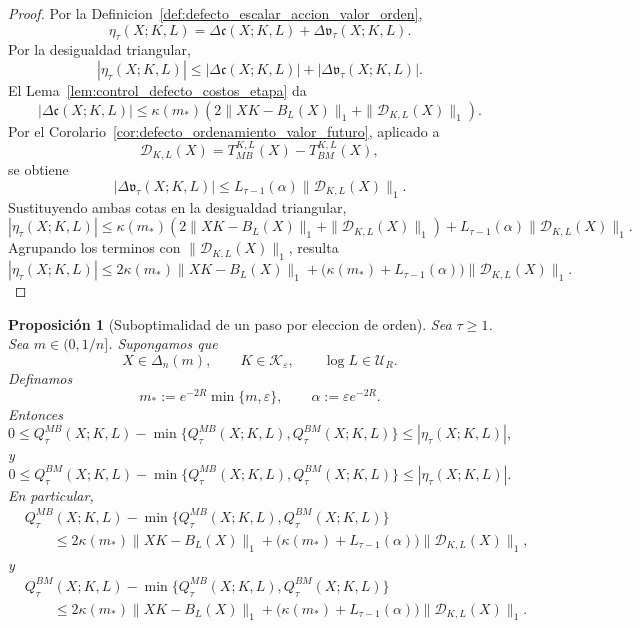 ﻿\documentclass[12pt]{article}
\newtheorem{proposicion}{Proposición}[section]
\begin{document}
\begin{proof}
Por la Definicion~\ref{def:defecto_escalar_accion_valor_orden},
\[
\eta_\tau(X;K,L)
=
\Delta\mathfrak c(X;K,L)
+
\Delta\mathfrak v_\tau(X;K,L).
\]
Por la desigualdad triangular,
\[
|\eta_\tau(X;K,L)|
\le
|\Delta\mathfrak c(X;K,L)|
+
|\Delta\mathfrak v_\tau(X;K,L)|.
\]
El Lema~\ref{lem:control_defecto_costos_etapa} da
\[
|\Delta\mathfrak c(X;K,L)|
\le
\kappa(m_*)
\left(
2\|XK-B_L(X)\|_1
+
\|\mathcal D_{K,L}(X)\|_1
\right).
\]
Por el Corolario~\ref{cor:defecto_ordenamiento_valor_futuro}, aplicado a
\[
\mathcal D_{K,L}(X)=T_{MB}^{K,L}(X)-T_{BM}^{K,L}(X),
\]
se obtiene
\[
|\Delta\mathfrak v_\tau(X;K,L)|
\le
L_{\tau-1}(\alpha)\|\mathcal D_{K,L}(X)\|_1.
\]
Sustituyendo ambas cotas en la desigualdad triangular,
\[
|\eta_\tau(X;K,L)|
\le
\kappa(m_*)
\left(
2\|XK-B_L(X)\|_1
+
\|\mathcal D_{K,L}(X)\|_1
\right)
+
L_{\tau-1}(\alpha)\|\mathcal D_{K,L}(X)\|_1.
\]
Agrupando los terminos con \(\|\mathcal D_{K,L}(X)\|_1\), resulta
\[
|\eta_\tau(X;K,L)|
\le
2\kappa(m_*)\|XK-B_L(X)\|_1
+
\bigl(\kappa(m_*)+L_{\tau-1}(\alpha)\bigr)
\|\mathcal D_{K,L}(X)\|_1.
\]
\end{proof}

\begin{proposicion}[Suboptimalidad de un paso por eleccion de orden]\label{prop:suboptimalidad_un_paso_eleccion_orden}
Sea \(\tau\ge 1\). Sea \(m\in(0,1/n]\). Supongamos que
\[
X\in\Delta_n(m),
\qquad
K\in\mathcal K_\varepsilon,
\qquad
\log L\in\mathcal U_R.
\]
Definamos
\[
m_*:=e^{-2R}\min\{m,\varepsilon\},
\qquad
\alpha:=\varepsilon e^{-2R}.
\]
Entonces
\[
0
\le
Q_\tau^{MB}(X;K,L)
-
\min\{Q_\tau^{MB}(X;K,L),Q_\tau^{BM}(X;K,L)\}
\le
|\eta_\tau(X;K,L)|,
\]
y
\[
0
\le
Q_\tau^{BM}(X;K,L)
-
\min\{Q_\tau^{MB}(X;K,L),Q_\tau^{BM}(X;K,L)\}
\le
|\eta_\tau(X;K,L)|.
\]
En particular,
\[
\begin{aligned}
&Q_\tau^{MB}(X;K,L)
-
\min\{Q_\tau^{MB}(X;K,L),Q_\tau^{BM}(X;K,L)\}
\\
&\qquad\le
2\kappa(m_*)\|XK-B_L(X)\|_1
+
\bigl(\kappa(m_*)+L_{\tau-1}(\alpha)\bigr)
\|\mathcal D_{K,L}(X)\|_1,
\end{aligned}
\]
y
\[
\begin{aligned}
&Q_\tau^{BM}(X;K,L)
-
\min\{Q_\tau^{MB}(X;K,L),Q_\tau^{BM}(X;K,L)\}
\\
&\qquad\le
2\kappa(m_*)\|XK-B_L(X)\|_1
+
\bigl(\kappa(m_*)+L_{\tau-1}(\alpha)\bigr)
\|\mathcal D_{K,L}(X)\|_1.
\end{aligned}
\]
\end{proposicion}
\end{document}
